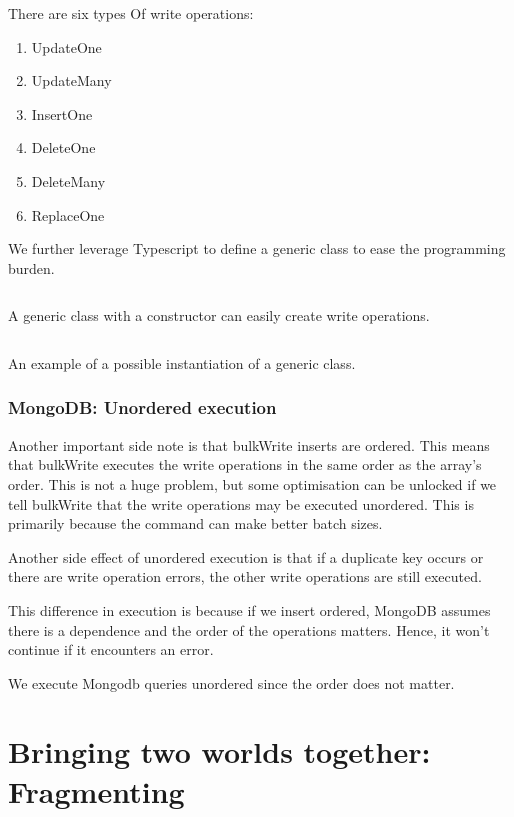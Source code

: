 There are six types Of write operations:
\begin{enumerate}
    \item UpdateOne
    \item UpdateMany
    \item InsertOne
    \item DeleteOne
    \item DeleteMany
    \item ReplaceOne
\end{enumerate}

We further leverage Typescript to define a generic class to ease the programming burden. 

\begin{listing}[H]
    \inputminted[linenos,frame=single,breaklines]{TypeScript}{code/type_write_op.ts}
    \caption{A generic class with a constructor can easily create write operations.}
\end{listing}

\begin{listing}[H]
    \inputminted[linenos,frame=single,breaklines]{TypeScript}{code/type_write_op_instan.ts}
    \caption{An example of a possible instantiation of a generic class.}
\end{listing}
\subsubsection{MongoDB: Unordered execution}
Another important side note is that bulkWrite inserts are ordered. This means that bulkWrite executes the write operations in the same order as the array's order. This is not a huge problem, but some optimisation can be unlocked if we tell bulkWrite that the write operations may be executed unordered. This is primarily because the command can make better batch sizes. 

Another side effect of unordered execution is that if a duplicate key occurs or there are write operation errors, the other write operations are still executed. 

This difference in execution is because if we insert ordered, MongoDB assumes there is a dependence and the order of the operations matters. Hence, it won't continue if it encounters an error.

We execute Mongodb queries unordered since the order does not matter.

\section{Bringing two worlds together: Fragmenting}
